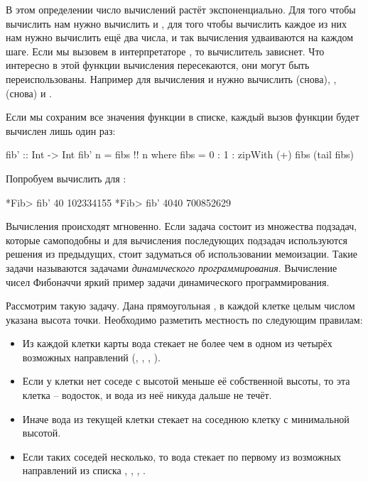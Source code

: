 В этом определении число вычислений
растёт экспоненциально. Для того чтобы вычислить  нам
нужно вычислить  и , для того чтобы вычислить
каждое из них нам нужно вычислить ещё два числа, и так вычисления 
удваиваются на каждом шаге. Если мы вызовем в интерпретаторе ,
то вычислитель зависнет. Что интересно в этой функции вычисления 
пересекаются, они могут быть переиспользованы. Например для вычисления
 и  нужно вычислить  (снова),
,  (снова) и . 

Если мы сохраним все значения функции в списке, каждый вызов
функции будет вычислен лишь один раз:

\begin{code}
fib' :: Int -> Int
fib' n = fibs !! n
    where fibs = 0 : 1 : zipWith (+) fibs (tail fibs)
\end{code}

Попробуем вычислить для :

\begin{code}
*Fib> fib' 40
102334155
*Fib> fib' 4040
700852629
\end{code}

Вычисления происходят мгновенно. Если 
задача состоит из множества подзадач, которые самоподобны
и для вычисления последующих подзадач используются решения из предыдущих, 
стоит задуматься об использовании мемоизации. Такие задачи 
называются задачами \emph{динамического программирования}. 
Вычисление чисел Фибоначчи яркий пример задачи динамического
программирования. 

Рассмотрим такую задачу. Дана прямоугольная 
, в каждой клетке целым числом указана
высота точки. Необходимо разметить местность по следующим
правилам:

\begin{itemize}
\item Из каждой клетки карты вода стекает
    не более чем в одном из четырёх возможных направлений
    (, , , ).
        
\item Если у клетки нет соседе с высотой меньше её собственной
    высоты, то эта клетка -- водосток, и вода из неё никуда
    дальше не течёт. 
        
\item Иначе вода из текущей клетки стекает на соседнюю клетку 
    с минимальной высотой.

\item Если таких соседей несколько, то вода стекает по первому 
    из возможных направлений из списка 
    , , 
    , .
\end{itemize}

